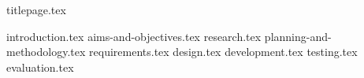 \documentclass{article}
\begin{document}
	{titlepage.tex}
	\tableofcontents
	\thispagestyle{empty}
	\cleardoublepage
	\setcounter{page}{1}

	{introduction.tex}
	{aims-and-objectives.tex}
	{research.tex}
	{planning-and-methodology.tex}
	{requirements.tex}
	{design.tex} 
	{development.tex} 
	{testing.tex} 
	{evaluation.tex} 
	
	\newpage
	\printbibliography
\end{document}
